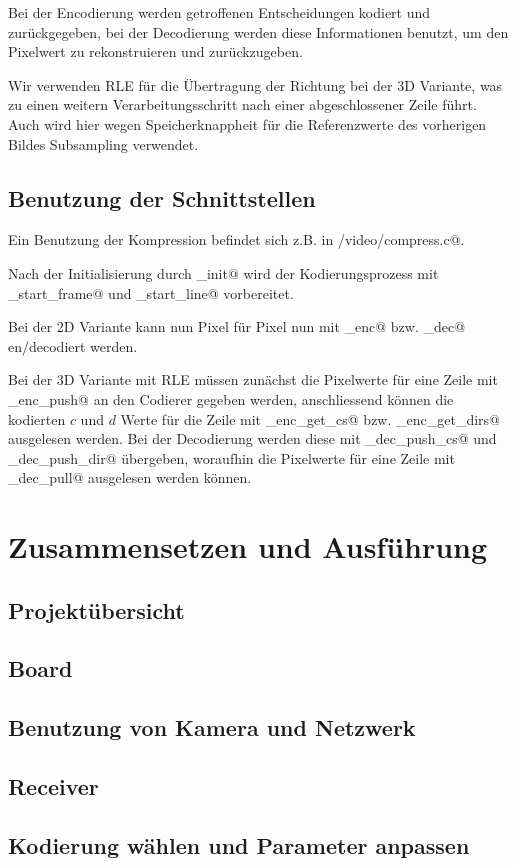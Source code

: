 Bei der Encodierung werden getroffenen Entscheidungen kodiert und zurückgegeben,
bei der Decodierung werden diese Informationen benutzt, um den Pixelwert zu rekonstruieren
und zurückzugeben. 

Wir verwenden RLE für die Übertragung der Richtung bei der 3D Variante,
was zu einen weitern Verarbeitungsschritt nach einer abgeschlossener Zeile führt.
Auch wird hier wegen Speicherknappheit für die Referenzwerte des vorherigen Bildes
Subsampling verwendet.

\subsection{Benutzung der Schnittstellen}
Ein Benutzung der Kompression befindet sich z.B. in \verb@board/video/compress.c@.

Nach der Initialisierung durch \lstinline@cmpr_init@ 
wird der Kodierungsprozess mit \lstinline@cmpr_start_frame@ und
\lstinline@cmpr_start_line@ vorbereitet.

Bei der 2D Variante kann nun Pixel für Pixel nun mit 
\lstinline@cmpr_enc@ bzw. \lstinline@cmpr_dec@ en/decodiert werden.

Bei der 3D Variante mit RLE müssen zunächst die Pixelwerte für eine Zeile mit
_enc_push@ an den Codierer gegeben werden, anschliessend 
können die kodierten $c$ und $d$ Werte für die Zeile 
mit _enc_get_cs@ bzw. _enc_get_dirs@ ausgelesen werden.
Bei der Decodierung werden diese mit _dec_push_cs@ und 
_dec_push_dir@ übergeben, woraufhin die Pixelwerte
für eine Zeile mit _dec_pull@ ausgelesen werden können.

\section{Zusammensetzen und Ausführung}

\subsection{Projektübersicht}

\subsection{Board}

\subsection{Benutzung von Kamera und Netzwerk}

\subsection{Receiver}

\subsection{Kodierung wählen und Parameter anpassen}

